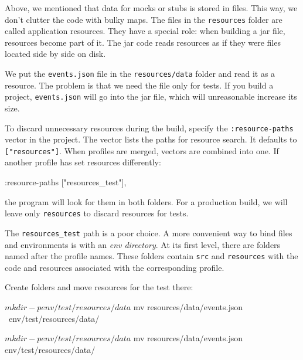 Above, we mentioned that data for mocks or stubs is stored in files. This way, we don't clutter the code with bulky maps. The files in the \verb|resources| folder are called application resources. They have a special role: when building a jar file, resources become part of it. The jar code reads resources as if they were files located side by side on disk.

We put the \verb|events.json| file in the \verb|resources/data| folder and read it as a resource. The problem is that we need the file only for tests. If you build a project, \verb|events.json| will go into the jar file, which will unreasonable increase its size.

To discard unnecessary resources during the build, specify the \verb|:resource-paths| vector in the project. The vector lists the paths for resource search. It defaults to \verb|["resources"]|. When profiles are merged, vectors are combined into one. If another profile has set resources differently:

\begin{english}
  \begin{clojure}
:resource-paths ["resources_test"],
  \end{clojure}
\end{english}

\noindent
the program will look for them in both folders. For a production build, we will leave only \verb|resources| to discard resources for tests.


The \verb|resources_test| path is a poor choice. A more convenient way to bind files and environments is with an \emph{env directory}. At its first level, there are folders named after the profile names. These folders contain \verb|src| and \verb|resources| with the code and resources associated with the corresponding profile.

Create folders and move resources for the test there:

\ifx\DEVICETYPE\MOBILE

\begin{english}
  \begin{bash}
$ mkdir -p env/test/resources/data
$ mv resources/data/events.json \
     env/test/resources/data/
  \end{bash}
\end{english}

\else

\begin{english}
  \begin{bash}
$ mkdir -p env/test/resources/data
$ mv resources/data/events.json env/test/resources/data/
  \end{bash}
\end{english}

